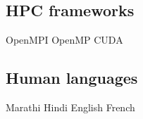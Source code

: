 \documentclass[]{smresume}
\begin{document}
\begin{minipage}[t]{0.33\textwidth}
\subsection{HPC frameworks}
OpenMPI \textbullet{} OpenMP \textbullet{} CUDA
\subsectionsep

\subsection{Human languages}
Marathi \textbullet{} Hindi \textbullet{} English \textbullet{} French
\sectionsep



%
%

\end{minipage} 
\hfill
\end{document}
